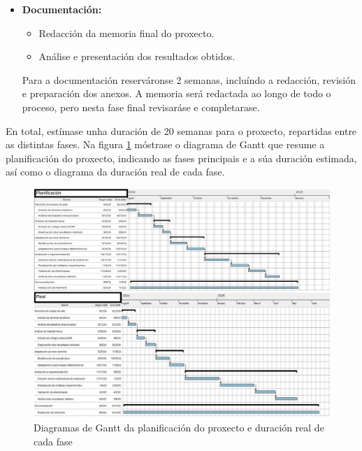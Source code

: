 \begin{itemize}
    \item \textbf{Documentación:}
    \begin{itemize}
        \item Redacción da memoria final do proxecto.
        \item Análise e presentación dos resultados obtidos.
    \end{itemize}
    Para a documentación reserváronse 2 semanas, incluíndo a redacción, revisión e preparación dos anexos. A memoria será redactada ao longo de todo o proceso, pero nesta fase final revisaráse e completarase.
\end{itemize}

En total, estímase unha duración de 20 semanas para o proxecto, repartidas entre as distintas fases.
Na figura \ref{fig:planificacion_proxecto} móstrase o diagrama de Gantt que resume a planificación do proxecto, indicando as fases principais e a súa duración estimada, así como o diagrama da duración real de cada fase.

\begin{figure}[h]
    \centering
    \includegraphics[height=1\textwidth, angle=90]{imaxes/gants-1.png}
    \caption{Diagramas de Gantt da planificación do proxecto e duración real de cada fase}
    \label{fig:planificacion_proxecto}
\end{figure}

